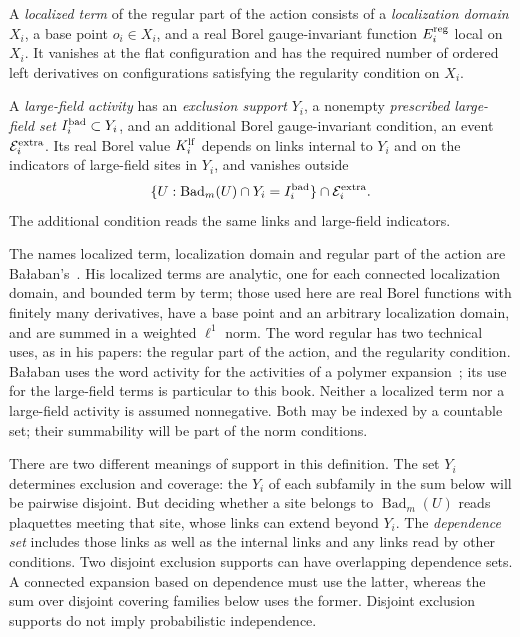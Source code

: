 \begin{definition}
\label{ch04:activities}
A \emph{localized term} of the regular part of the action consists of a \emph{localization domain} $X_i$, a base point $o_i\in X_i$,
and a real Borel gauge-invariant function $E_i^{\rm reg}$ local on $X_i$.
It vanishes at the flat configuration and has the required number of
ordered left derivatives on configurations satisfying the regularity condition on $X_i$.

A \emph{large-field activity} has an \emph{exclusion support} $Y_i$, a nonempty \emph{prescribed large-field
set} $I_i^{\rm bad}\subset Y_i$, and an additional Borel gauge-invariant
condition, an event $\mathcal E_i^{\rm extra}$. Its real Borel value
$K_i^{\rm lf}$ depends on links internal to $Y_i$ and on the indicators of
large-field sites in $Y_i$, and vanishes outside
\begin{equation}
 \{U:\operatorname{Bad}_m(U)\cap Y_i=I_i^{\rm bad}\}
                         \cap\mathcal E_i^{\rm extra}.
 \label{ch04:eligibility}
\end{equation}
The additional condition reads the same links and large-field indicators.
\end{definition}
The names localized term, localization domain and regular part of the action are Ba\l{}aban's~\cite{Balaban1987RG,Balaban1988Expansions}. His localized terms are analytic, one for each connected localization domain, and bounded term by term; those used here are real Borel functions with finitely many derivatives, have a base point and an arbitrary localization domain, and are summed in a weighted $\ell^1$ norm. The word regular has two technical uses, as in his papers: the regular part of the action, and the regularity condition. Ba\l{}aban uses the word activity for the activities of a polymer expansion~\cite{Balaban1988Cluster}; its use for the large-field terms is particular to this book. Neither a localized term nor a large-field activity is assumed nonnegative. Both may be indexed by a
countable set; their summability will be part of the norm conditions.

There are two different meanings of support in this definition. The set
$Y_i$ determines exclusion and coverage: the $Y_i$ of each subfamily in the sum below will be pairwise disjoint.
But deciding whether a site belongs to $\operatorname{Bad}_m(U)$ reads
plaquettes meeting that site, whose links can extend beyond $Y_i$. The
\emph{dependence set} includes those links as well as the internal
links and any links read by other conditions. Two disjoint exclusion supports
can have overlapping dependence sets. A connected expansion based
on dependence must use the latter, whereas the sum over disjoint covering families below uses
the former. Disjoint exclusion supports do not imply probabilistic
independence.

